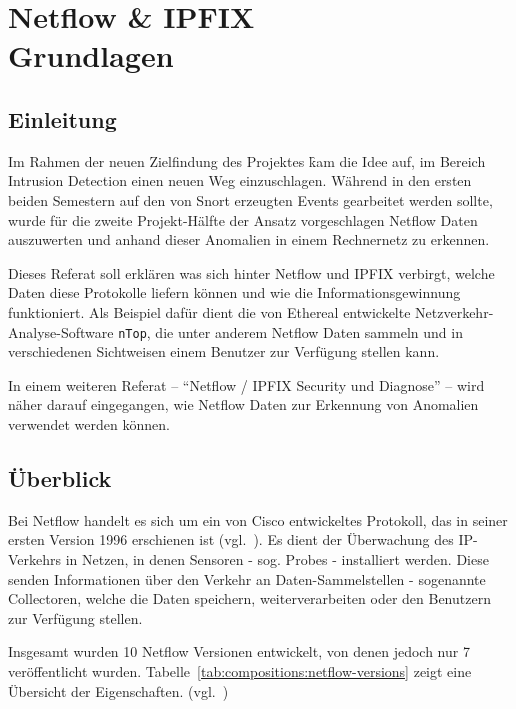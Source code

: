 \section[Netflow \& IPFIX -- Grundlagen]
  {Netflow \& IPFIX\\Grundlagen}
\label{sec:compositions:netflow-basics}
\authors{\AB}{}

\subsection{Einleitung}

Im Rahmen der neuen Zielfindung des Projektes \f kam die Idee auf, im
Bereich Intrusion Detection einen neuen Weg einzuschlagen. Während in den ersten
beiden Semestern auf den von Snort erzeugten Events gearbeitet werden sollte,
wurde für die zweite Projekt-Hälfte der Ansatz vorgeschlagen Netflow Daten
auszuwerten und anhand dieser Anomalien in einem Rechnernetz zu erkennen.

Dieses Referat soll erklären was sich hinter Netflow und IPFIX verbirgt, welche
Daten diese Protokolle liefern können und wie die Informationsgewinnung
funktioniert. Als Beispiel dafür dient die von Ethereal entwickelte 
Netzverkehr-Analyse-Software \texttt{nTop}, die unter anderem Netflow Daten sammeln und
in verschiedenen Sichtweisen einem Benutzer zur Verfügung stellen kann.

In einem weiteren Referat -- \enquote{Netflow / IPFIX Security und Diagnose} -- wird näher
darauf eingegangen, wie Netflow Daten zur Erkennung von Anomalien verwendet
werden können.

\subsection{Überblick}
\label{sec:compositions:netflow-basics:overview}

Bei Netflow handelt es sich um ein von Cisco entwickeltes Protokoll, das in
seiner ersten Version 1996 erschienen ist (vgl.~\cite[2]{netflow-oslebo}).
Es dient der Überwachung des IP-Verkehrs in Netzen, in denen Sensoren - sog.
Probes - installiert werden. Diese senden Informationen über den Verkehr an
Daten-Sammelstellen - sogenannte Collectoren, welche die Daten speichern,
weiterverarbeiten oder den Benutzern zur Verfügung stellen.

Insgesamt wurden 10 Netflow Versionen entwickelt, von denen jedoch nur 7
veröffentlicht wurden. Tabelle~\ref{tab:compositions:netflow-versions} zeigt
eine Übersicht der Eigenschaften. (vgl.~\cite{netflow-caligare})

